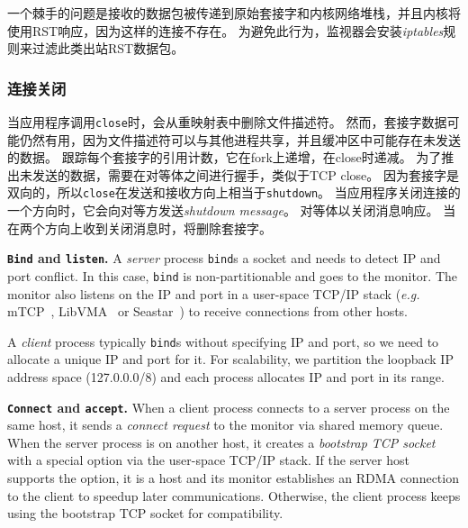 一个棘手的问题是接收的数据包被传递到原始套接字和内核网络堆栈，并且内核将使用RST响应，因为这样的连接不存在。
为避免此行为，监视器会安装\emph {iptables}规则来过滤此类出站RST数据包。

%	


\subsubsection{连接关闭}



当应用程序调用\texttt {close}时，\libipc {}会从重映射表中删除文件描述符。
然而，套接字数据可能仍然有用，因为文件描述符可以与其他进程共享，并且缓冲区中可能存在未发送的数据。
\libipc{} 跟踪每个套接字的引用计数，它在fork上递增，在close时递减。
为了推出未发送的数据，需要在对等体之间进行握手，类似于TCP close。
因为套接字是双向的，所以\texttt {close}在发送和接收方向上相当于\texttt {shutdown}。
当应用程序关闭连接的一个方向时，它会向对等方发送\emph {shutdown message}。
对等体以关闭消息响应。
当\libipc {}在两个方向上收到关闭消息时，将删除套接字。


\iffalse

\textbf{\texttt{Bind} and \texttt{listen}.}
A \emph{server} process \texttt{bind}s a socket and needs to detect IP and port conflict. In this case, \texttt{bind} is non-partitionable and goes to the monitor. The monitor also listens on the IP and port in a user-space TCP/IP stack (\textit{e.g.} mTCP~\cite{jeong2014mtcp}, LibVMA~\cite{libvma} or Seastar~\cite{seastar}) to receive connections from other hosts.

A \emph{client} process typically \texttt{bind}s without specifying IP and port, so we need to allocate a unique IP and port for it. For scalability, we partition the loopback IP address space (127.0.0.0/8) and each process allocates IP and port in its range.

\textbf{\texttt{Connect} and \texttt{accept}.}
When a client process connects to a server process on the same host, it sends a \textit{connect request} to the monitor via shared memory queue. When the server process is on another host, it creates a \textit{bootstrap TCP socket} with a special option via the user-space TCP/IP stack. If the server host supports the option, it is a \sys host and its monitor establishes an RDMA connection to the client to speedup later communications. Otherwise, the client process keeps using the bootstrap TCP socket for compatibility.

